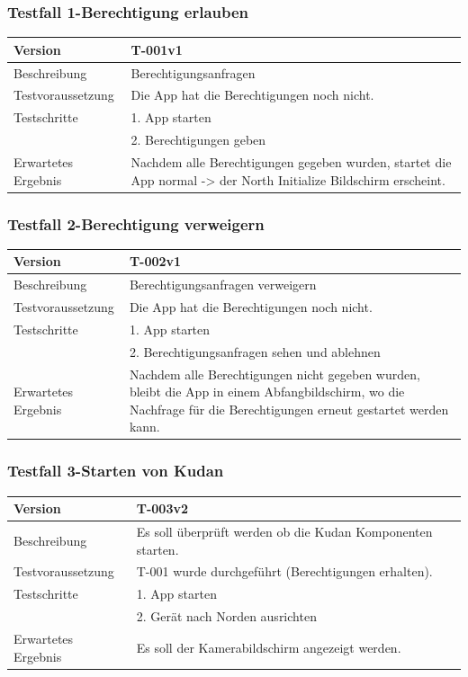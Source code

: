 \documentclass[a4paper]{scrreprt}
\begin{document}
\subsubsection{Testfall 1-Berechtigung erlauben}
\begin{tabularx}{\textwidth}{|l|X|}
\hline
	Version &
	T-001v1 \\
\hline
	Beschreibung & Berechtigungsanfragen \\
\hline
	Testvoraussetzung & Die App hat die Berechtigungen noch nicht. \\
\hline
	Testschritte &
		1. App starten \\ &
		2. Berechtigungen geben \\
\hline
	Erwartetes Ergebnis & Nachdem alle Berechtigungen gegeben wurden, startet die App normal -> der North Initialize Bildschirm erscheint. \\
\hline
\end{tabularx}
\subsubsection{Testfall 2-Berechtigung verweigern}
\begin{tabularx}{\textwidth}{|l|X|}
\hline
	Version &
	T-002v1 \\
\hline
	Beschreibung & Berechtigungsanfragen verweigern \\
\hline
	Testvoraussetzung & Die App hat die Berechtigungen noch nicht. \\
\hline
	Testschritte &
		1. App starten \\ &
		2. Berechtigungsanfragen sehen und ablehnen \\
\hline
	Erwartetes Ergebnis & Nachdem alle Berechtigungen nicht gegeben wurden, bleibt die App in einem Abfangbildschirm, wo die Nachfrage für die Berechtigungen erneut gestartet werden kann. \\
\hline
\end{tabularx}
\subsubsection{Testfall 3-Starten von Kudan}
\begin{tabularx}{\textwidth}{|l|X|}
\hline
	Version &
	T-003v2 \\
\hline
	Beschreibung &
	Es soll überprüft werden ob die Kudan Komponenten starten.\\
\hline
	Testvoraussetzung &
	T-001 wurde durchgeführt (Berechtigungen erhalten). \\
\hline
	Testschritte &
		1. App starten \\ &
		2. Gerät nach Norden ausrichten \\
\hline
	Erwartetes Ergebnis &
	Es soll der Kamerabildschirm angezeigt werden. \\
\hline
\end{tabularx}
\end{document}
